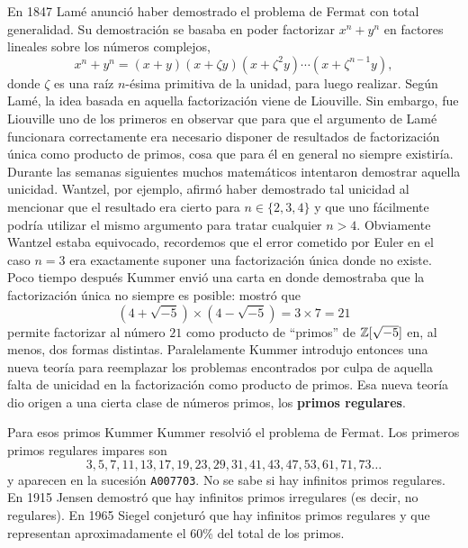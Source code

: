 En 1847 Lamé anunció haber demostrado el problema de Fermat con total
generalidad. Su demostración se basaba en poder factorizar $x^n+y^n$ en
factores lineales sobre los números complejos, 
\[
	x^n+y^n=(x+y)(x+\zeta y)(x+\zeta^2y)\cdots (x+\zeta^{n-1}y),
\]
donde $\zeta$ es una raíz $n$-ésima primitiva de la unidad, para luego realizar. 
Según Lamé, la idea basada en aquella 
factorización viene de Liouville. Sin embargo, fue Liouville uno de los
primeros en observar que para que el argumento de Lamé funcionara correctamente
era necesario disponer de resultados de factorización única como producto de
primos, cosa que para él en general no siempre existiría. Durante las semanas
siguientes muchos matemáticos intentaron demostrar aquella unicidad. Wantzel,
por ejemplo, afirmó haber demostrado tal unicidad al mencionar que el resultado
era cierto para $n\in\{2,3,4\}$ y que uno fácilmente podría utilizar el mismo
argumento para tratar cualquier $n>4$. Obviamente Wantzel estaba equivocado,
recordemos que el error cometido por Euler en el caso $n=3$ era exactamente
suponer una factorización única donde no existe. Poco tiempo después Kummer
envió una carta en donde demostraba que la factorización
única no siempre es posible: mostró que
\[
	(4+\sqrt{-5})\times (4-\sqrt{-5})=3\times 7=21
\]
permite factorizar al número $21$ como producto de ``primos'' de
$\mathbb{Z}[\sqrt{-5}]$ en, al menos, dos formas distintas. Paralelamente Kummer
introdujo entonces una nueva teoría para reemplazar los problemas encontrados
por culpa de aquella falta de unicidad en la factorización como producto de
primos. Esa nueva teoría dio origen a una cierta clase de números primos, los
\textbf{primos regulares}. 

Para esos primos Kummer Kummer resolvió el problema de Fermat.  Los primeros
primos regulares impares son
\[
    3, 5, 7, 11, 13, 17, 19, 23, 29, 31, 41, 43, 47, 53, 61, 71, 73\dots
\]
y aparecen en la sucesión \verb+A007703+. No se sabe si hay infinitos primos
regulares. En 1915 Jensen demostró que hay infinitos primos irregulares (es
decir, no regulares).  En 1965 Siegel conjeturó que hay infinitos primos
regulares y que representan aproximadamente el 60\% del total de los primos.

